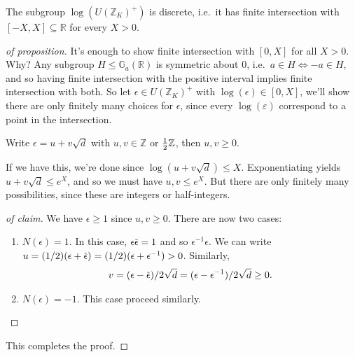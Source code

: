 \begin{proposition}

The subgroup \(\log( U ({\mathbb{Z}}_K)^+ )\) is discrete, i.e.~it has
finite intersection with \([-X, X] \subseteq {\mathbb{R}}\) for every
\(X>0\).

\end{proposition}

\begin{proof}[of proposition]

It's enough to show finite intersection with \([0, X]\) for all \(X>0\).
Why? Any subgroup \(H\leq {\mathbb{G}}_a({\mathbb{R}})\) is symmetric
about 0, i.e.~\(a\in H \iff -a\in H\), and so having finite intersection
with the positive interval implies finite intersection with both. So let
\(\epsilon \in U({\mathbb{Z}}_K)^+\) with
\(\log( \epsilon) \in [0, X]\), we'll show there are only finitely many
choices for \(\epsilon\), since every \(\log(\varepsilon)\) correspond
to a point in the intersection.

\begin{claim}

Write \(\epsilon = u + v \sqrt{d}\) with \(u,v \in {\mathbb{Z}}\) or
\({1\over 2}{\mathbb{Z}}\), then \(u, v \geq 0\).

\end{claim}

If we have this, we're done since \(\log( u + v \sqrt{d}) \leq X\).
Exponentiating yields \(u + v\sqrt {d} \leq e^X\), and so we must have
\(u, v \leq e^X\). But there are only finitely many possibilities, since
these are integers or half-integers.

\begin{proof}[of claim]

We have \(\epsilon \geq 1\) since \(u, v \geq 0\). There are now two
cases:

\begin{enumerate}
\def\labelenumi{\arabic{enumi}.}
\item
  \(N( \epsilon) = 1\). In this case,
  \(\epsilon \mkern 1.5mu\overline{\mkern-1.5mu\epsilon \mkern-1.5mu}\mkern 1.5mu= 1\)
  and so \(\epsilon ^{-1} \epsilon\). We can write
  \(u = (1/2)( \epsilon + \mkern 1.5mu\overline{\mkern-1.5mu\epsilon\mkern-1.5mu}\mkern 1.5mu) = (1/2)(\epsilon + \epsilon ^{-1} ) > 0\).
  Similarly,
  \begin{align*} 
    v = (\epsilon - \mkern 1.5mu\overline{\mkern-1.5mu\epsilon\mkern-1.5mu}\mkern 1.5mu)/2 \sqrt{d} = (\epsilon - \epsilon ^{-1} ) / 2 \sqrt{d} \geq 0
    .\end{align*}
\item
  \(N(\epsilon) = -1\). This case proceed similarly.
\end{enumerate}

\end{proof}

This completes the proof.

\end{proof}

